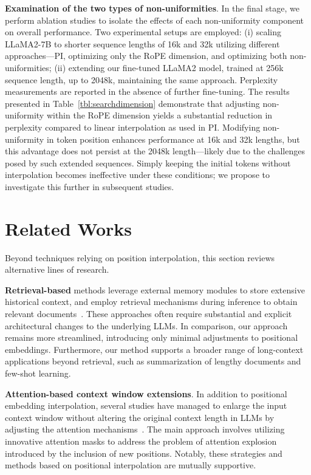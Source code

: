 \textbf{Examination of the two types of non-uniformities}. In the final stage, we perform ablation studies to isolate the effects of each non-uniformity component on overall performance. Two experimental setups are employed: (i) scaling LLaMA2-7B to shorter sequence lengths of 16k and 32k utilizing different approaches—PI, optimizing only the RoPE dimension, and optimizing both non-uniformities; (ii) extending our fine-tuned LLaMA2 model, trained at 256k sequence length, up to 2048k, maintaining the same approach. Perplexity measurements are reported in the absence of further fine-tuning. The results presented in Table~\ref{tbl:searchdimension} demonstrate that adjusting non-uniformity within the RoPE dimension yields a substantial reduction in perplexity compared to linear interpolation as used in PI. Modifying non-uniformity in token position enhances performance at 16k and 32k lengths, but this advantage does not persist at the 2048k length—likely due to the challenges posed by such extended sequences. Simply keeping the initial tokens without interpolation becomes ineffective under these conditions; we propose to investigate this further in subsequent studies.

\section{Related Works}

Beyond techniques relying on position interpolation, this section reviews alternative lines of research. 

\textbf{Retrieval-based} methods leverage external memory modules to store extensive historical context, and employ retrieval mechanisms during inference to obtain relevant documents~\cite{longllama,wang2023augmenting,borgeaud2022improving}. These approaches often require substantial and explicit architectural changes to the underlying LLMs. In comparison, our approach remains more streamlined, introducing only minimal adjustments to positional embeddings. Furthermore, our method supports a broader range of long-context applications beyond retrieval, such as summarization of lengthy documents and few-shot learning.

\textbf{Attention-based context window extensions}. In addition to positional embedding interpolation, several studies have managed to enlarge the input context window without altering the original context length in LLMs by adjusting the attention mechanisms~\cite{han2023lminfinite, streamingllm,parallelwindow}. The main approach involves utilizing innovative attention masks to address the problem of attention explosion introduced by the inclusion of new positions. Notably, these strategies and methods based on positional interpolation are mutually supportive.

